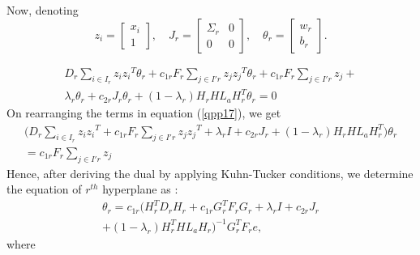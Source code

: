\documentclass[12pt,a4paper,oneside,english]{report}
\begin{document}
Now, denoting 
\[
z_i = \begin{bmatrix} x_i \\ 1 \end{bmatrix}, \quad 
J_r = \begin{bmatrix} 
\Sigma_r & 0 \\ 
0 & 0 
\end{bmatrix}, \quad 
\theta_r = \begin{bmatrix} 
w_r \\ 
b_r 
\end{bmatrix}.
\]


\begin{eqnarray}
D_r\sum_{i \in I_r}z_i{z_i}^T\theta_r + c_{1r}F_r\sum_{j \in I'r}z_j{z_j}^T\theta_r + c_{1r}F_r\sum_{j \in I'r}z_j+ \nonumber \\ \lambda_r\theta_r + c_{2r}J_r\theta_r+(1-\lambda_r)H_rHL_a{H}_r^T\theta_r = 0 \label{qpp17}
\end{eqnarray}
On rearranging the terms in equation (\ref{qpp17}), we get
\begin{eqnarray}
\Bigg(D_r\sum_{i \in I_r}z_i{z_i}^T + c_{1r}F_r\sum_{j \in I'r}z_j{z_j}^T + \lambda_rI + c_{2r}J_r  + (1-\lambda_r)H_rHL_a{H}_r^T\Bigg)\theta_r  \nonumber\\ = c_{1r}F_r\sum_{j \in I'r}z_j \label{qpp18}
\end{eqnarray}
Hence, after deriving the dual by applying Kuhn-Tucker conditions, we determine the equation of $r^{th}$ hyperplane as : 
\begin{eqnarray}
\theta_r = c_{1r} \Bigg( 
H_r^T D_r H_r + c_{1r} G_r^T F_r G_r + \lambda_r I + c_{2r} J_r \nonumber \\
+ (1 - \lambda_r) H_r^T H L_a H_r
\Bigg)^{-1} G_r^T F_r e, \label{qpp20}
\end{eqnarray}
where 
\end{document}
